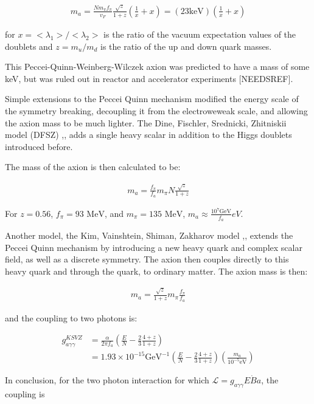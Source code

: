 \documentclass[12pt,twosides]{book}
\begin{document}
\begin{align*}
m_a = \frac{Nm_\pi f_\pi}{v_F}\frac{\sqrt{z}}{1+z}(\frac{1}{x}+x) = (23 \text{keV})(\frac{1}{x}+x)
\end{align*}

for $ x = <\lambda_1>/<\lambda_2>$ is the ratio of the vacuum expectation values of the doublets and $z = m_u/m_d$ is the ratio of the up and down quark masses.

This Peccei-Quinn-Weinberg-Wilczek axion was predicted to have a mass of some keV, but was ruled out in reactor and accelerator experiments \cite{crystalball90} [NEEDSREF].

Simple extensions to the Peccei Quinn mechanism modified the energy scale of the symmetry breaking, decoupling it from the electroweweak scale, and allowing the axion mass to be much lighter. The Dine, Fischler, Srednicki, Zhitniskii model (DFSZ) \cite{dine81},\cite{zhitniskii81}, adds a single heavy scalar in addition to the Higgs doublets introduced before. 

The mass of the axion is then calculated to be:

\begin{align*}
m_a = \frac{f_\pi}{f_a} m_\pi N \frac{\sqrt{z}}{1+z}
\end{align*}

For $z= 0.56$, $f_\pi = 93 \text{ MeV}$, and $m_\pi = 135\text{ MeV}$, $m_a \approx \frac{10^7\text{GeV}}{f_a}eV$.

Another model, the Kim, Vainshtein, Shiman, Zakharov model \cite{kim79},\cite{shifman80}, extends the Peccei Quinn mechanism by introducing a new heavy quark and complex scalar field, as well as a discrete symmetry. The axion then couples directly to this heavy quark and through the quark, to ordinary matter. The axion mass is then:

\begin{align*}
m_a = \frac{\sqrt{z}}{1+z}m_\pi\frac{f_\pi}{f_a}
\end{align*}

and the coupling to two photons is:

\begin{align*}
g_{a\gamma\gamma}^{KSVZ} &= \frac{\alpha}{2\pi f_a}(\frac{E}{N}-\frac{2}{3}\frac{4+z}{1+z}) 
\\ &= 1.93\times10^{-15}\text{GeV}^{-1}(\frac{E}{N}-\frac{2}{3}\frac{4+z}{1+z})(\frac{m_a}{10^{-5}\text{eV}})
\end{align*}

In conclusion, for the two photon interaction for which $\mathcal{L} = g_{a\gamma\gamma}E\dot B a$, the coupling is
\end{document}
